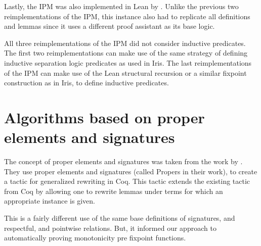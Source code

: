 \documentclass[thesis.tex]{subfiles}
\begin{document}
Lastly, the IPM was also implemented in Lean by  \cite{koenigImprovedInterfaceInteractive2022}. Unlike the previous two reimplementations of the IPM, this instance also had to replicate all definitions and lemmas since it uses a different proof assistant as its base logic.

All three reimplementations of the IPM did not consider inductive predicates. The first two reimplementations can make use of the same strategy of defining inductive separation logic predicates as used in Iris. The last reimplementations of the IPM can make use of the Lean structural recursion or a similar fixpoint construction as in Iris, to define inductive predicates.

\section{Algorithms based on proper elements and signatures}
The concept of proper elements and signatures was taken from the work by  \cite{sozeauNewLookGeneralized2009}. They use proper elements and signatures (called Propers in their work), to create a tactic for generalized rewriting in Coq. This tactic extends the existing  tactic from Coq by allowing one to rewrite lemmas under terms for which an appropriate  instance is given.

This is a fairly different use of the same base definitions of signatures, and respectful, and pointwise relations. But, it informed our approach to automatically proving monotonicity pre fixpoint functions.
\end{document}
